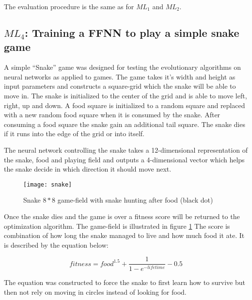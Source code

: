 The evaluation procedure is the same as for $ML_{1}$ and $ML_{2}$.

\subsection{$ML_{4}$: Training a FFNN to play a simple snake game}

A simple ``Snake'' game was designed for testing the evolutionary algorithms on neural networks as applied to games. The game takes it's width and height as input parameters and constructs a square-grid which the snake will be able to move in. The snake is initialized to the center of the grid and is able to move left, right, up and down. A food square is initialized to a random square and replaced with a new random food square when it is consumed by the snake. After consuming a food square the snake gain an additional tail square. The snake dies if it runs into the edge of the grid or into itself.

The neural network controlling the snake takes a 12-dimensional representation of the snake, food and playing field and outputs a 4-dimensional vector which helps the snake decide in which direction it should move next.

\begin{figure}[H]
  \centering
  \texttt{[image: snake]}
  \caption{Snake $8*8$ game-field with snake hunting after food (black dot)}
  \label{snake}
\end{figure}

Once the snake dies and the game is over a fitness score will be returned to the optimization algorithm. The game-field is illustrated in figure \ref{snake} The score is combination of how long the snake managed to live and how much food it ate. It is described by the equation below:

\begin{equation}
  fitness = food^{1.5} +  \frac{1}{1-e^{-lifetime}}  - 0.5
\end{equation}

The equation was constructed to force the snake to first learn how to survive but then not rely on moving in circles instead of looking for food.
